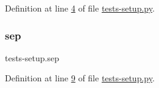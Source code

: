 Definition at line \mbox{\hyperlink{tests-setup_8py_source_l00004}{4}} of file \mbox{\hyperlink{tests-setup_8py_source}{tests-\/setup.\+py}}.

\mbox{\label{namespacetests-setup_a92ab4d3dccd0fc5347ed0f5399869803}} 
\subsubsection{\texorpdfstring{sep}{sep}}
{\footnotesize\ttfamily tests-\/setup.\+sep}



Definition at line \mbox{\hyperlink{tests-setup_8py_source_l00009}{9}} of file \mbox{\hyperlink{tests-setup_8py_source}{tests-\/setup.\+py}}.

